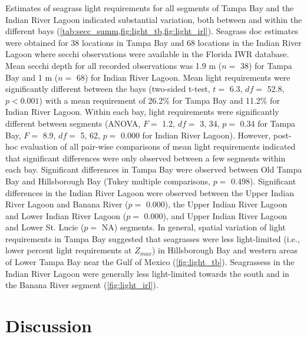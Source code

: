 \documentclass[letterpaper,12pt,oneside]{article}\usepackage[]{graphicx}\usepackage[]{color}
\begin{document}
Estimates of seagrass light requirements for all segments of Tampa Bay and the Indian River Lagoon indicated substantial variation, both between and within the different bays (\cref{tab:secc_summ,fig:light_tb,fig:light_irl}).  Seagrass \ac{doc} estimates were obtained for 38 locations in Tampa Bay and 68 locations in the Indian River Lagoon where secchi observations were available in the Florida \ac{IWR} database.  Mean secchi depth for all recorded observations was 1.9 m ($n=$ 38) for Tampa Bay and 1 m ($n=$ 68) for Indian River Lagoon.  Mean light requirements were significantly different between the bays (two-sided t-test, $t=$ 6.3, $df=$ 52.8, $p < 0.001$) with a mean requirement of 26.2\% for Tampa Bay and 11.2\% for Indian River Lagoon.  Within each bay, light requirements were significantly different between segments (ANOVA, $F =$ 1.2, $df =$ 3, 34, $p = $ 0.34 for Tampa Bay, $F =$ 8.9, $df =$ 5, 62, $p = $ 0.000 for Indian River Lagoon).  However, post-hoc evaluation of all pair-wise comparisons of mean light requirements indicated that significant differences were only observed between a few segments within each bay.  Significant differences in Tampa Bay were observed between Old Tampa Bay and Hillsborough Bay (Tukey multiple comparisons, $p =$ 0.498).  Significant differences in the Indian River Lagoon were observed between the Upper Indian River Lagoon and Banana River ($p =$ 0.000), the Upper Indian River Lagoon and Lower Indian River Lagoon ($p =$ 0.000), and Upper Indian River Lagoon and Lower St. Lucie ($p =$ NA) segments.  In general, spatial variation of light requirements in Tampa Bay suggested that seagrasses were less light-limited (i.e., lower percent light requirements at $Z_{max}$) in Hillsborough Bay and western areas of Lower Tampa Bay near the Gulf of Mexico (\cref{fig:light_tb}).  Seagrassess in the Indian River Lagoon were generally less light-limited towards the south and in the Banana River segment (\cref{fig:light_irl}).

\section{Discussion}



\end{document}
